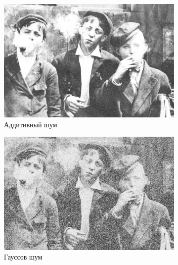 \begin{figure}[ht]
\begin{subfigure}[b]{0.5\linewidth}
      \includegraphics[width=0.95\linewidth]{../Contraharmonic_Filter/Contraharmonic_Additive_noise_(m,n=(3,_3),q=1.85).jpg} 
      \caption{Аддитивный шум} 
      \label{contraharmonic_1.85:c} 
      \vspace{4ex}
    \end{subfigure}%
    \begin{subfigure}[b]{0.5\linewidth}
      \centering
      \includegraphics[width=0.95\linewidth]{../Contraharmonic_Filter/Contraharmonic_Gaussian_noise_(m,n=(3,_3),q=1.85).jpg} 
      \caption{Гауссов шум} 
      \label{contraharmonic_1.85:d} 
      \vspace{4ex}
    \end{subfigure}
    \begin{subfigure}[b]{0.5\linewidth}
      \centering

\end{subfigure}
\end{figure}
